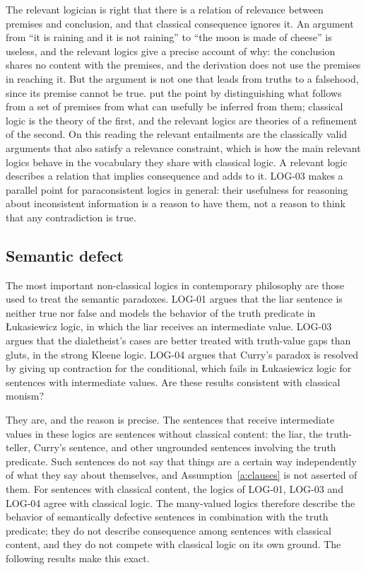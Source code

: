 \documentclass{situationist-preprint}
\begin{document}
The relevant logician is right that there is a relation of relevance between premises and conclusion, and that classical consequence ignores it. An argument from \enquote{it is raining and it is not raining} to \enquote{the moon is made of cheese} is useless, and the relevant logics give a precise account of why: the conclusion shares no content with the premises, and the derivation does not use the premises in reaching it. But the argument is not one that leads from truths to a falsehood, since its premise cannot be true. \citet{Burgess2005} put the point by distinguishing what follows from a set of premises from what can usefully be inferred from them; classical logic is the theory of the first, and the relevant logics are theories of a refinement of the second. On this reading the relevant entailments are the classically valid arguments that also satisfy a relevance constraint, which is how the main relevant logics behave in the vocabulary they share with classical logic. A relevant logic describes a relation that implies consequence and adds to it. LOG-03 makes a parallel point for paraconsistent logics in general: their usefulness for reasoning about inconsistent information is a reason to have them, not a reason to think that any contradiction is true.

\subsection{Semantic defect}\label{s:defect}

The most important non-classical logics in contemporary philosophy are those used to treat the semantic paradoxes. LOG-01 argues that the liar sentence is neither true nor false and models the behavior of the truth predicate in Łukasiewicz logic, in which the liar receives an intermediate value. LOG-03 argues that the dialetheist's cases are better treated with truth-value gaps than gluts, in the strong Kleene logic. LOG-04 argues that Curry's paradox is resolved by giving up contraction for the conditional, which fails in Łukasiewicz logic for sentences with intermediate values. Are these results consistent with classical monism?

They are, and the reason is precise. The sentences that receive intermediate values in these logics are sentences without classical content: the liar, the truth-teller, Curry's sentence, and other ungrounded sentences involving the truth predicate. Such sentences do not say that things are a certain way independently of what they say about themselves, and Assumption~\ref{a:clauses} is not asserted of them. For sentences with classical content, the logics of LOG-01, LOG-03 and LOG-04 agree with classical logic. The many-valued logics therefore describe the behavior of semantically defective sentences in combination with the truth predicate; they do not describe consequence among sentences with classical content, and they do not compete with classical logic on its own ground. The following results make this exact.
\end{document}
